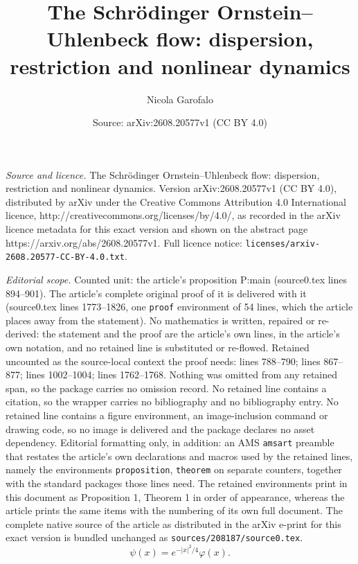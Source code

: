 \documentclass[10pt,a4paper]{amsart}
\title{The Schr\"odinger Ornstein--Uhlenbeck flow: dispersion, restriction and nonlinear dynamics}
\author{Nicola Garofalo}
\date{Source: arXiv:2608.20577v1 (CC BY 4.0)}
\def \vf{\varphi}
\begin{document}
\maketitle

\noindent\emph{Source and licence.} The Schr\"odinger Ornstein--Uhlenbeck flow: dispersion, restriction and nonlinear dynamics. Version arXiv:2608.20577v1 (CC BY 4.0), distributed by arXiv under the Creative Commons Attribution 4.0 International licence, http://creativecommons.org/licenses/by/4.0/, as recorded in the arXiv licence metadata for this exact version and shown on the abstract page https://arxiv.org/abs/2608.20577v1. Full licence notice: \texttt{licenses/arxiv-2608.20577-CC-BY-4.0.txt}.\par\smallskip

\noindent\textit{Editorial scope.} Counted unit: the article's proposition P:main (source0.tex lines 894--901). The article's complete original proof of it is delivered with it (source0.tex lines 1773--1826, one \texttt{proof} environment of 54 lines, which the article places away from the statement). No mathematics is written, repaired or re-derived: the statement and the proof are the article's own lines, in the article's own notation, and no retained line is substituted or re-flowed.  Retained uncounted as the source-local context the proof needs: lines 788--790; lines 867--877; lines 1002--1004; lines 1762--1768.  Nothing was omitted from any retained span, so the package carries no omission record.  No retained line contains a citation, so the wrapper carries no bibliography and no bibliography entry.  No retained line contains a figure environment, an image-inclusion command or drawing code, so no image is delivered and the package declares no asset dependency.  Editorial formatting only, in addition: an AMS \texttt{amsart} preamble that restates the article's own declarations and macros used by the retained lines, namely the environments \texttt{proposition}, \texttt{theorem} on separate counters, together with the standard packages those lines need.  The retained environments print in this document as Proposition 1, Theorem 1 in order of appearance, whereas the article prints the same items with the numbering of its own full document.  The complete native source of the article as distributed in the arXiv e-print for this exact version is bundled unchanged as \texttt{sources/208187/source0.tex}.
\begin{equation}\label{psi}
\psi(x)=e^{-|x|^2/4}\vf(x).
\end{equation}
\end{document}
